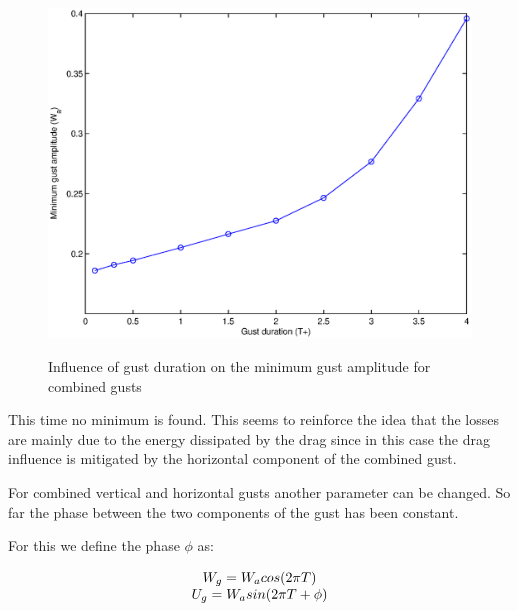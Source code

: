     \begin{figure}[h!]
      \begin{center}
	\scalebox{0.8}
	{\includegraphics{./Figures/combined_gust_amplitude_vs_duration.eps}}
      \end{center}
      \caption{Influence of gust duration on the minimum gust amplitude for combined gusts}
      \label{fig:combined_amplitude_duration}
    \end{figure}


    \FloatBarrier

    \par This time no minimum is found.
    This seems to reinforce the idea that the losses are mainly due to the energy dissipated by the drag since in this case the drag influence is mitigated by the horizontal component of the combined gust.


    For combined vertical and horizontal gusts another parameter can be changed.
    So far the phase between the two components of the gust has been constant.

    \par For this we define the phase $\phi$ as:

    \begin{equation}
      \begin{array}[c]{c}
	W_g=W_a cos(2\pi T) \\
	U_g=W_a sin(2\pi T + \phi)
      \end{array}
      \label{eqn:combined_gust_phase}
    \end{equation}

